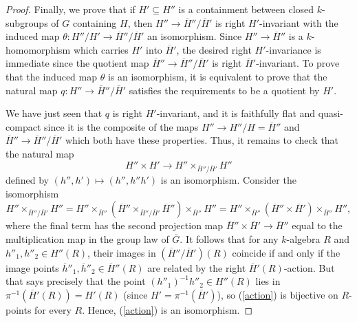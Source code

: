 \documentclass[10pt]{article}
\renewcommand{\(}{\left(}
\renewcommand{\)}{\right)}
\numberwithin{thm}{subsection}
\begin{document}
\begin{proof}
Finally, we prove that if $H' \subseteq H''$ is a containment between closed
$k$-subgroups of $G$ containing $H$, then $H'' \rightarrow \overline{H}''/\overline{H}'$
is right $H'$-invariant with the induced map $\theta:H''/H' \rightarrow \overline{H}''/\overline{H}'$
an isomorphism.  Since $H'' \rightarrow \overline{H}''$ is a $k$-homomorphism
which carries $H'$ into $\overline{H}'$, the desired right $H'$-invariance is immediate
since the quotient map $\overline{H}'' \rightarrow \overline{H}''/\overline{H}'$ is right 
$\overline{H}'$-invariant.   To prove that the induced map $\theta$ is an isomorphism,
it is equivalent to prove that the natural map
$q:H'' \rightarrow \overline{H}''/\overline{H}'$
satisfies the requirements to be a quotient by $H'$.  

We have just seen that $q$ is right $H'$-invariant, and it is faithfully flat and quasi-compact
since it is the composite of the maps $H'' \rightarrow H''/H = \overline{H}''$
and $\overline{H}'' \rightarrow \overline{H}''/\overline{H}'$ which both have these
properties.  Thus, it remains to check that the natural map
\begin{equation}\label{action}
H'' \times H' \rightarrow H'' \times_{\overline{H}''/\overline{H}'} H''
\end{equation}
defined by $(h'', h') \mapsto (h'', h'' h')$ 
is an isomorphism.   Consider the isomorphism 
$$H'' \times_{\overline{H}''/\overline{H}'} H'' =
H'' \times_{\overline{H}''} (\overline{H}'' \times_{\overline{H}''/\overline{H}'} \overline{H}'') \times_{
\overline{H}''} H'' = H'' \times_{\overline{H}''} (\overline{H}'' \times \overline{H}') \times_{\overline{H}''}
H'',$$
where the final term has the second projection map
$\overline{H}'' \times \overline{H}' \rightarrow \overline{H}''$ equal to the multiplication map
in the group law of $\overline{G}$.   It follows that for any $k$-algebra $R$ 
and $h''_1, h''_2 \in H''(R)$, their images in $(\overline{H}''/\overline{H}')(R)$ coincide
if and only if the image points $\overline{h}''_1, \overline{h}''_2 \in \overline{H}''(R)$
are related by the right $\overline{H}'(R)$-action.   But that says precisely that the point 
$(h''_1)^{-1} h''_2 \in H''(R)$ lies in $\pi^{-1}(\overline{H}'(R)) = H'(R)$
(since $H' = \pi^{-1}(\overline{H}')$), so (\ref{action}) is bijective on $R$-points
for every $R$.  Hence, (\ref{action}) is an isomorphism. 
\end{proof}
\end{document}
